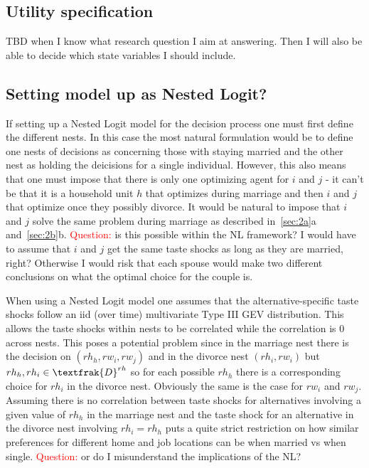 \subsection{Utility specification}
TBD when I know what research question I aim at answering. Then I will also be able to decide which state variables I should include.

\subsection{Setting model up as Nested Logit?}
If setting up a Nested Logit model for the decision process one must first define the different nests. In this case the most natural formulation would be to define one nests of decisions as concerning those with staying married and the other nest as holding the deicisions for a single individual. However, this also means that one must impose that there is only one optimizing agent for $i$ and $j$ - it can't be that it is a household unit $h$ that optimizes during marriage and then $i$ and $j$ that optimize once they possibly divorce. It would be natural to impose that $i$ and $j$ solve the same problem during marriage as described in~\cref{sec:2a}a and~\cref{sec:2b}b. \textcolor{red}{Question:} is this possible within the NL framework? I would have to assume that $i$ and $j$ get the same taste shocks as long as they are married, right? Otherwise I would risk that each spouse would make two different conclusions on what the optimal choice for the couple is.

When using a Nested Logit model one assumes that the alternative-specific taste shocks follow an iid (over time) multivariate Type III GEV distribution. This allows the taste shocks within nests to be correlated while the correlation is 0 across nests. This poses a potential problem since in the marriage nest there is the decision on $(rh_h,rw_i,rw_j)$ and in the divorce nest $(rh_i,rw_i)$ but ${rh_h,rh_i}\in\textfrak{D}^{rh}$ so for each possible $rh_h$ there is a corresponding choice for $rh_i$ in the divorce nest. Obviously the same is the case for $rw_i$ and $rw_j$. Assuming there is no correlation between taste shocks for alternatives involving a given value of $rh_h$ in the marriage nest and the taste shock for an alternative in the divorce nest involving $rh_i=rh_h$ puts a quite strict restriction on how similar preferences for different home and job locations can be when married vs when single. \textcolor{red}{Question:} or do I misunderstand the implications of the NL? 


